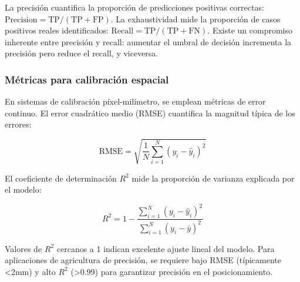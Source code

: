 La precisión cuantifica la proporción de predicciones positivas correctas: $\text{Precision} = \text{TP}/(\text{TP} + \text{FP})$. La exhaustividad mide la proporción de casos positivos reales identificados: $\text{Recall} = \text{TP}/(\text{TP} + \text{FN})$. Existe un compromiso inherente entre precisión y recall: aumentar el umbral de decisión incrementa la precisión pero reduce el recall, y viceversa.

\subsubsection{Métricas para calibración espacial}

En sistemas de calibración píxel-milímetro, se emplean métricas de error continuo. El error cuadrático medio (RMSE) cuantifica la magnitud típica de los errores:

\begin{equation}
\text{RMSE} = \sqrt{\frac{1}{N}\sum_{i=1}^{N}(y_i - \hat{y}_i)^2}
\end{equation}

El coeficiente de determinación $R^2$ mide la proporción de varianza explicada por el modelo:

\begin{equation}
R^2 = 1 - \frac{\sum_{i=1}^{N}(y_i - \hat{y}_i)^2}{\sum_{i=1}^{N}(y_i - \bar{y})^2}
\end{equation}

Valores de $R^2$ cercanos a 1 indican excelente ajuste lineal del modelo. Para aplicaciones de agricultura de precisión, se requiere bajo RMSE (típicamente <2mm) y alto $R^2$ (>0.99) para garantizar precisión en el posicionamiento.
